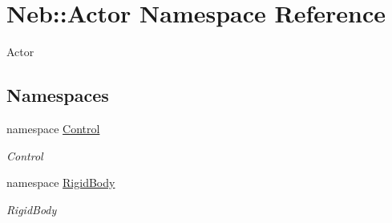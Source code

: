 \hypertarget{namespaceNeb_1_1Actor}{\section{\-Neb\-:\-:\-Actor \-Namespace \-Reference}
\label{namespaceNeb_1_1Actor}
}


\-Actor  


\subsection*{\-Namespaces}
\begin{DoxyCompactItemize}
\item 
namespace \hyperlink{namespaceNeb_1_1Actor_1_1Control}{\-Control}
\begin{DoxyCompactList}\small\item\em \-Control \end{DoxyCompactList}\item 
namespace \hyperlink{namespaceNeb_1_1Actor_1_1RigidBody}{\-Rigid\-Body}
\begin{DoxyCompactList}\small\item\em \-Rigid\-Body \end{DoxyCompactList}\end{DoxyCompactItemize}
